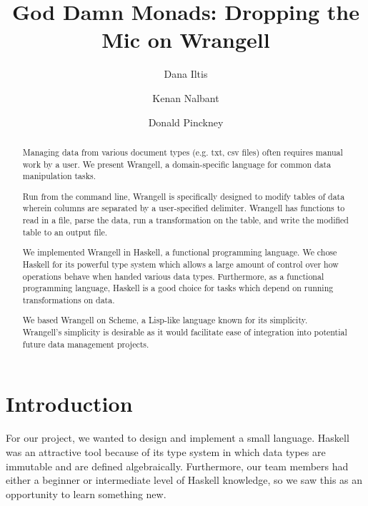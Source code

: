 \documentclass[preprint,nocopyrightspace]{sig-alternate}
\begin{document}
%

\title{God Damn Monads: Dropping the Mic on Wrangell}

\author{Dana Iltis}
\author{Kenan Nalbant}
\author{Donald Pinckney}


\maketitle

\begin{abstract}
Managing data from various document types (e.g. txt, csv files) often requires manual work by a user. We present Wrangell, a domain-specific language for common data manipulation tasks.

Run from the command line, Wrangell is specifically designed to modify tables of data wherein columns are separated by a user-specified delimiter. Wrangell has functions to read in a file, parse the data, run a transformation on the table, and write the modified table to an output file. 

We implemented Wrangell in Haskell, a functional programming language. We chose Haskell for its powerful type system which allows a large amount of control over how operations behave when handed various data types. Furthermore, as a functional programming language, Haskell is a good choice for tasks which depend on running transformations on data.

We based Wrangell on Scheme, a Lisp-like language known for its simplicity. Wrangell's simplicity is desirable as it would facilitate ease of integration into potential future data management projects.


\end{abstract}

\section{Introduction}
For our project, we wanted to design and implement a small language. Haskell was an attractive tool because of its type system in which data types are immutable and are defined algebraically. Furthermore, our team members had either a beginner or intermediate level of Haskell knowledge, so we saw this as an opportunity to learn something new. 
\end{document}
